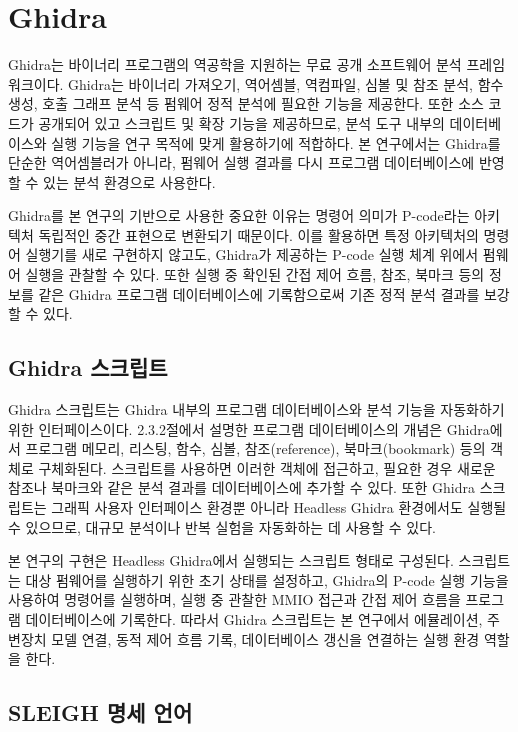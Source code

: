 \documentclass[master,korean,final]{kaist-ucs}
\begin{document}
\section{Ghidra}

Ghidra는 바이너리 프로그램의 역공학을 지원하는 무료 공개 소프트웨어 분석 프레임워크이다\cite{Ghidra}. Ghidra는 바이너리 가져오기, 역어셈블, 역컴파일, 심볼 및 참조 분석, 함수 생성, 호출 그래프 분석 등 펌웨어 정적 분석에 필요한 기능을 제공한다. 또한 소스 코드가 공개되어 있고 스크립트 및 확장 기능을 제공하므로, 분석 도구 내부의 데이터베이스와 실행 기능을 연구 목적에 맞게 활용하기에 적합하다. 본 연구에서는 Ghidra를 단순한 역어셈블러가 아니라, 펌웨어 실행 결과를 다시 프로그램 데이터베이스에 반영할 수 있는 분석 환경으로 사용한다.

Ghidra를 본 연구의 기반으로 사용한 중요한 이유는 명령어 의미가 P-code라는 아키텍처 독립적인 중간 표현으로 변환되기 때문이다. 이를 활용하면 특정 아키텍처의 명령어 실행기를 새로 구현하지 않고도, Ghidra가 제공하는 P-code 실행 체계 위에서 펌웨어 실행을 관찰할 수 있다. 또한 실행 중 확인된 간접 제어 흐름, 참조, 북마크 등의 정보를 같은 Ghidra 프로그램 데이터베이스에 기록함으로써 기존 정적 분석 결과를 보강할 수 있다.

\subsection{Ghidra 스크립트}

Ghidra 스크립트는 Ghidra 내부의 프로그램 데이터베이스와 분석 기능을 자동화하기 위한 인터페이스이다. 2.3.2절에서 설명한 프로그램 데이터베이스의 개념은 Ghidra에서 프로그램 메모리, 리스팅, 함수, 심볼, 참조(reference), 북마크(bookmark) 등의 객체로 구체화된다. 스크립트를 사용하면 이러한 객체에 접근하고, 필요한 경우 새로운 참조나 북마크와 같은 분석 결과를 데이터베이스에 추가할 수 있다. 또한 Ghidra 스크립트는 그래픽 사용자 인터페이스 환경뿐 아니라 Headless Ghidra 환경에서도 실행될 수 있으므로, 대규모 분석이나 반복 실험을 자동화하는 데 사용할 수 있다.

본 연구의 구현은 Headless Ghidra에서 실행되는 스크립트 형태로 구성된다. 스크립트는 대상 펌웨어를 실행하기 위한 초기 상태를 설정하고, Ghidra의 P-code 실행 기능을 사용하여 명령어를 실행하며, 실행 중 관찰한 MMIO 접근과 간접 제어 흐름을 프로그램 데이터베이스에 기록한다. 따라서 Ghidra 스크립트는 본 연구에서 에뮬레이션, 주변장치 모델 연결, 동적 제어 흐름 기록, 데이터베이스 갱신을 연결하는 실행 환경 역할을 한다.

\subsection{SLEIGH 명세 언어}
\end{document}
